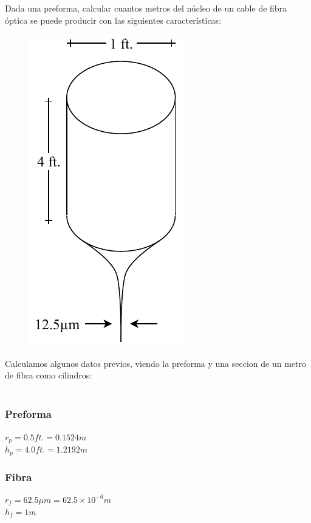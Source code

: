 Dada una preforma, calcular cuantos metros del núcleo de un cable de fibra óptica se puede producir con las siguientes características:
\begin{figure}[H]
\centering
\includegraphics[page=1,scale=0.8]{PreformaImg.pdf}
\end{figure}
Calculamos algunos datos previos, viendo la preforma y una seccion de un metro de fibra como cilindros: \\{ }\\
\begin{minipage}[t]{.5\textwidth}
\raggedright
\subsubsection*{Preforma}
$r_p=0.5 ft. = 0.1524m$ \\
$h_p=4.0 ft. = 1.2192m$
\end{minipage}%
\begin{minipage}[t]{.5\textwidth}
\raggedright
\subsubsection*{Fibra}
$r_f=62.5\mu m=62.5\times 10^{-6}m$ \\
$h_f=1m$
\end{minipage}%
